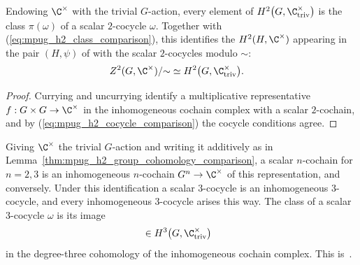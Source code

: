 \begin{lemma}
    \label{thm:mpug_h2_group_cohomology_comparison}
    \leanok
    Endowing $\C^\times$ with the trivial $G$-action, every element of
    $H^2\bigl(G,\C^\times_{\mathrm{triv}}\bigr)$ is the class $\pi(\omega)$ of
    a scalar $2$-cocycle $\omega$. Together with
    (\ref{eq:mpug_h2_class_comparison}), this identifies the
    $H^2(H,\C^\times)$ appearing in the pair $(H,\psi)$ of
    \cite[lines~1927--1931]{FrancoRubio2025MPUGauging} with the scalar
    $2$-cocycles modulo $\sim$:
    \begin{align}
        Z^2(G,\C^\times)/{\sim}
         & \simeq H^2\bigl(G,\C^\times_{\mathrm{triv}}\bigr).
        \label{eq:mpug_h2_equivalence}
    \end{align}
\end{lemma}

\begin{proof}\leanok
    Currying and uncurrying identify a multiplicative representative
    $f:G\times G\to\C^\times$ in the inhomogeneous cochain complex with a
    scalar $2$-cochain, and by (\ref{eq:mpug_h2_cocycle_comparison}) the
    cocycle conditions agree.
\end{proof}

\begin{definition}
    \label{def:mpug_h3_group_cohomology}
    \leanok
    Giving $\C^\times$ the trivial $G$-action and writing it additively as in
    Lemma~\ref{thm:mpug_h2_group_cohomology_comparison}, a scalar
    $n$-cochain for $n=2,3$ is an inhomogeneous $n$-cochain
    $G^n\to\C^\times$ of this representation, and conversely. Under this
    identification a scalar $3$-cocycle is an inhomogeneous $3$-cocycle, and
    every inhomogeneous $3$-cocycle arises this way. The class of a scalar
    $3$-cocycle $\omega$ is its image
    \begin{align}
        [\omega] & \in H^3\bigl(G,\C^\times_{\mathrm{triv}}\bigr)
        \label{eq:mpug_h3_class}
    \end{align}
    in the degree-three cohomology of the inhomogeneous cochain complex.
    This is~\cite[``Scalar three-cocycles in degree-three group
        cohomology'']{QICLean2026Blueprint}.
\end{definition}

